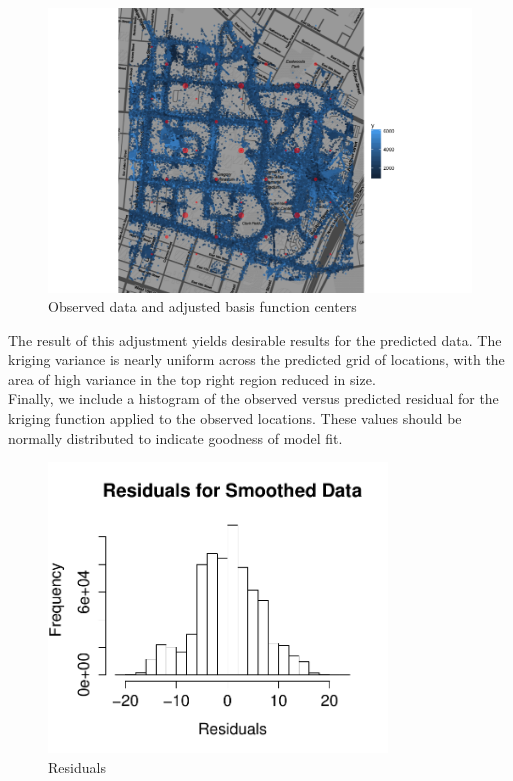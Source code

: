 \documentclass[11pt]{article}
\begin{document}
\begin{figure}[h!]
\centering
\includegraphics[width=160mm,keepaspectratio]{Images/data_grid_new.png}
\caption{Observed data and adjusted basis function centers \label{fig:9}}
\end{figure}

The result of this adjustment yields desirable results for the predicted data.  The kriging variance is nearly uniform across the predicted grid of locations, with the area of high variance in the top right region reduced in size.\\

Finally, we include a histogram of the observed versus predicted residual for the kriging function applied to the observed locations.  These values should be normally distributed to indicate goodness of model fit.\\

\begin{figure}[h!]
\centering
\includegraphics[width=90mm,keepaspectratio]{Images/Residuals_for_smoothing.pdf}
\caption{Residuals \label{fig:10}}
\end{figure}
\end{document}
